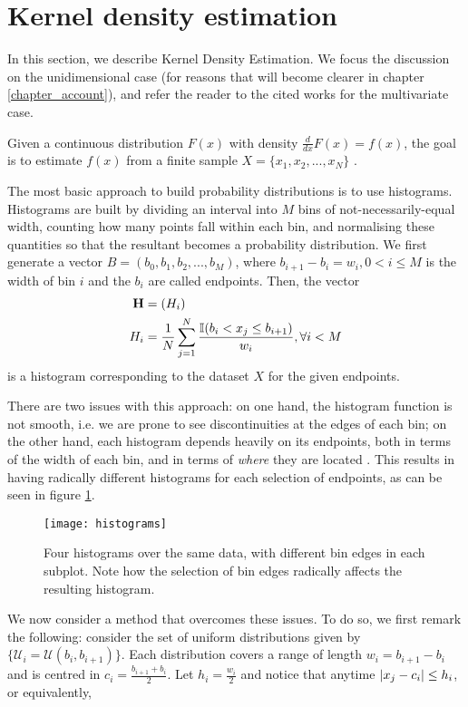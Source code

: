 \documentclass[../main.tex]{subfiles}
\begin{document}
\section{Kernel density estimation} \label{section_kde}
In this section, we describe Kernel Density Estimation. We focus the discussion on the unidimensional case (for reasons that will become clearer in chapter \ref{chapter_account}), and refer the reader to the cited works for the multivariate case. 
\par Given a continuous distribution $F(x)$ with density $\frac{d}{dx}F(x) = f(x)$, the goal is to estimate $f(x)$ from a finite sample $X = \{x_1, x_2, ..., x_N\}$ \cite{Hansen2009}. 
\par The most basic approach to build probability distributions is to use histograms. Histograms are built by dividing an interval into $M$ bins of not-necessarily-equal width, counting how many points fall within each bin, and normalising these quantities so that the resultant becomes a probability distribution. We first generate a vector $B = (b_0, b_1, b_2, ..., b_M)$, where $b_{i+1} - b_i = w_i, 0 < i \leq M$ is the width of bin $i$ and the $b_i$ are called endpoints. Then, the vector 
\begin{align*}
\mathbf{H} &= (H_i)\\
H_i &= \frac{1}{N}\sum_{j=1}^{N}\frac{\mathbb{I}( b_{i} < x_j \leq b_{i+1})}{w_i}, \forall i < M
\end{align*}
is a histogram corresponding to the dataset $X$ for the given endpoints.
\par There are two issues with this approach: on one hand, the histogram function is not smooth, i.e. we are prone to see discontinuities at the edges of each bin; on the other hand, each histogram depends heavily on its endpoints, both in terms of the width of each bin, and in terms of \emph{where} they are located \cite{Duong2004}. This results in having radically different histograms for each selection of endpoints, as can be seen in figure \ref{fig_histograms}.
\begin{figure}[t]
\centering
\texttt{[image: histograms]}
\caption{Four histograms over the same data, with different bin edges in each subplot. Note how the selection of bin edges radically affects the resulting histogram.}
\label{fig_histograms}
\end{figure}
\par We now consider a method that overcomes these issues. To do so, we first remark the following: consider the set of uniform distributions given by $\{\mathcal{U}_i = \mathcal{U}(b_{i}, b_{i+1})\}$. Each distribution covers a range of length $w_i = b_{i+1}-b_i$ and is centred in $c_i = \frac{b_{i+1}+b_i}{2}$.  Let $h_i = \frac{w_i}{2}$ and notice that anytime $\lvert x_j - c_i\rvert \leq h_i$, or equivalently,
\end{document}
